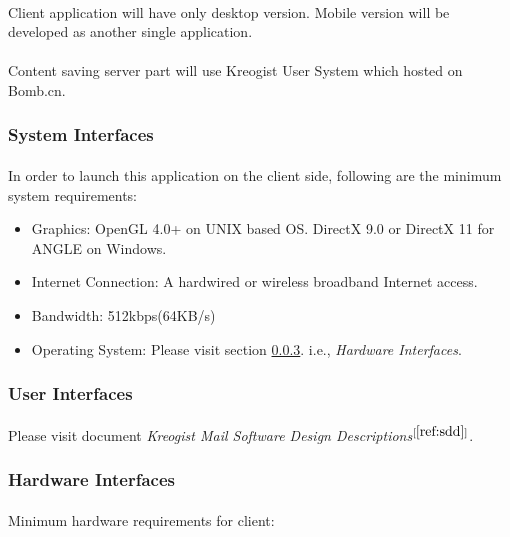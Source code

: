 \documentclass[11pt,a4paper]{article}
\begin{document}
            \paragraph{} Client application will have only desktop version. Mobile version will be developed as another single application.
            \paragraph{} Content saving server part will use Kreogist User System which hosted on Bomb.cn.
            \subsubsection{System Interfaces}\label{section:sys_interfaces}
                \paragraph{} In order to launch this application on the client side, following are the minimum system requirements:
                \begin{itemize}
                    \item Graphics: OpenGL 4.0+ on UNIX based OS. DirectX 9.0 or DirectX 11 for ANGLE on Windows.
                    \item Internet Connection: A hardwired or wireless broadband Internet access.
                    \item Bandwidth: 512kbps(64KB/s)
                    \item Operating System: Please visit section \ref{section:hard_interface}. i.e., \emph{Hardware Interfaces}.
                \end{itemize}
            \subsubsection{User Interfaces}
            	\paragraph{} Please visit document \emph{Kreogist Mail Software Design Descriptions}$^{[\ref{ref:sdd}]}$.
            \subsubsection{Hardware Interfaces}\label{section:hard_interface}
                \paragraph{} Minimum hardware requirements for client:
\end{document}
